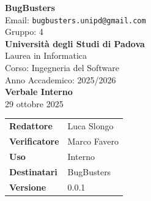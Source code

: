 \documentclass[a4paper,12pt]{article}
\begin{document}
\begin{center}  
  
  {\Large\bfseries\color{primaryblue} BugBusters}\\[0.3cm]
  {\small\color{darkgray} Email: \texttt{bugbusters.unipd@gmail.com}} \\[0.1cm]
  {\small\color{darkgray} Gruppo: 4} \\[0.5cm]

  {\large\bfseries Università degli Studi di Padova}\\[0.3cm]
  {\small Laurea in Informatica}\\[0.2cm]
  {\small Corso: Ingegneria del Software}\\[0.2cm]
  {\small Anno Accademico: 2025/2026}\\[0.8cm]

  {\Huge\bfseries\color{primaryblue} Verbale Interno}\\[0.3cm]
  {\Large\color{secondaryblue} 29 ottobre 2025}\\[0.8cm]
\end{center}

\begin{center}
\begin{tcolorbox}[colback=lightgray,colframe=primaryblue,width=0.85\textwidth,arc=3mm,boxrule=0.5pt]
\begin{tabular}{@{}ll@{}}
\textbf{Redattore}    & Luca Slongo\\
\textbf{Verificatore}    & Marco Favero \\
\textbf{Uso}          & Interno \\
\textbf{Destinatari}  & BugBusters \\
\textbf{Versione} & 0.0.1\\

\end{tabular}
\end{tcolorbox}
\end{center}
\end{document}

